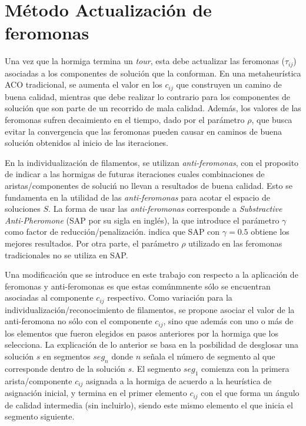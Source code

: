 \section{M\'etodo Actualizaci\'on de feromonas}
\label{subsec:pheroUpdate}
Una vez que la hormiga termina un {\it tour}, esta debe actualizar las feromonas ($\tau_{ij}$) asociadas a los componentes de soluci\'on que la conforman. En una metaheur\'istica ACO tradicional, se aumenta el valor en los $c_{ij}$ que construyen un camino de buena calidad, mientras que debe realizar lo contrario para los componentes de soluci\'on que son parte de un recorrido de mala calidad. Adem\'as, los valores de las feromonas sufren decaimiento en el tiempo, dado por el par\'ametro $\rho$, que busca evitar la convergencia que las feromonas pueden causar en caminos de buena soluci\'on obtenidos al inicio de las iteraciones.


En la individualizaci\'on de filamentos, se utilizan {\it anti-feromonas}, con el proposito de indicar a las hormigas de futuras iteraciones cuales combinaciones de aristas/componentes de soluci\'n no llevan a resultados de buena calidad. Esto se fundamenta en la utilidad de las {\it anti-feromonas} para acotar el espacio de soluciones $S$. La forma de usar las {\it anti-feromonas} corresponde a {\it Substractive Anti-Pheromone} (SAP por su sigla en ingl\'es), la que introduce el par\'ametro $\gamma$ como factor de reducci\'on/penalizaci\'on. \cite{montgomery2002anti} indica que SAP con $\gamma = 0.5$ obtiene los mejores resultados. Por otra parte, el par\'ametro $\rho$ utilizado en las feromonas tradicionales no se utiliza en SAP.


Una modificaci\'on que se introduce en este trabajo con respecto a la aplicaci\'on de  feromonas y anti-feromonas es que estas com\'unmnente s\'olo se encuentran asociadas al componente $c_{ij}$ respectivo. Como variaci\'on para la individualizaci\'on/reconocimiento de filamentos, se propone asociar el valor de la anti-feromona no s\'olo con el componente $c_{ij}$, sino que adem\'as con uno o m\'as de los elementos que fueron elegidos en pasos anteriores por la hormiga que los selecciona. La explicaci\'on de lo anterior se basa en la posbilidad de desglosar una soluci\'on $s$ en segmentos $seg_{n}$ donde $n$ se\~nala el n\'umero de segmento al que corresponde dentro de la soluci\'on $s$. El segmento $seg_1$ comienza con la primera arista/componente $c_{ij}$ asignada a la hormiga de acuerdo a la heur\'istica de asignaci\'on inicial, y termina en el primer elemento $c_{ij}$ con el que forma un \'angulo de calidad intermedia (sin incluirlo), siendo este mismo elemento el que inicia el segmento siguiente.


